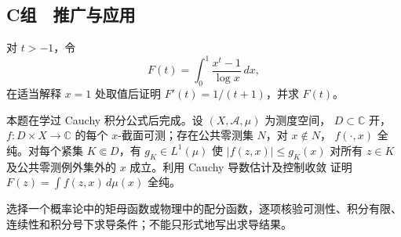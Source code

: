 \subsection*{C组　推广与应用}
\begin{enumerate}[label=\textbf{\thechapter.\arabic*.},resume]
对 \(t>-1\)，令
\[
 F(t)=\int_0^1\frac{x^t-1}{\log x}\,dx,
\]
在适当解释 \(x=1\) 处取值后证明 \(F'(t)=1/(t+1)\)，并求 \(F(t)\)。

本题在学过 Cauchy 积分公式后完成。设 \((X,\mathcal A,\mu)\) 为测度空间，
\(D\subset\mathbb C\) 开，\(f:D\times X\to\mathbb C\) 的每个
\(x\)-截面可测；存在公共零测集 \(N\)，对 \(x\notin N\)，
\(f(\cdot,x)\) 全纯。对每个紧集 \(K\Subset D\)，有
\(g_K\in L^1(\mu)\) 使 \(|f(z,x)|\le g_K(x)\) 对所有 \(z\in K\)
及公共零测例外集外的 \(x\) 成立。利用 Cauchy 导数估计及控制收敛
证明 \(F(z)=\int f(z,x)\,d\mu(x)\) 全纯。

选择一个概率论中的矩母函数或物理中的配分函数，逐项核验可测性、积分有限、
连续性和积分号下求导条件；不能只形式地写出求导结果。
\end{enumerate}
